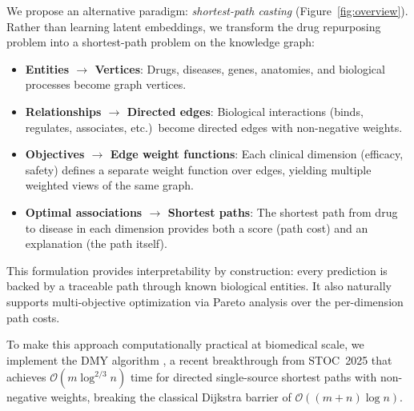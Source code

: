 \documentclass[11pt,a4paper]{article}
\newcommand{\BigO}[1]{\mathcal{O}(#1)}
\begin{document}
We propose an alternative paradigm: \emph{shortest-path casting}
(Figure~\ref{fig:overview}). Rather than learning latent embeddings,
we transform the drug repurposing problem into a shortest-path
problem on the knowledge graph:

\begin{itemize}
    \item \textbf{Entities $\to$ Vertices}: Drugs, diseases, genes,
    anatomies, and biological processes become graph vertices.
    \item \textbf{Relationships $\to$ Directed edges}: Biological
    interactions (binds, regulates, associates, etc.)\ become
    directed edges with non-negative weights.
    \item \textbf{Objectives $\to$ Edge weight functions}: Each
    clinical dimension (efficacy, safety) defines a separate weight
    function over edges, yielding multiple weighted views of the
    same graph.
    \item \textbf{Optimal associations $\to$ Shortest paths}: The
    shortest path from drug to disease in each dimension provides
    both a score (path cost) and an explanation (the path itself).
\end{itemize}

This formulation provides interpretability by construction: every
prediction is backed by a traceable path through known biological
entities. It also naturally supports multi-objective optimization
via Pareto analysis over the per-dimension path costs.

To make this approach computationally practical at biomedical scale,
we implement the DMY algorithm \citep{duan2025sssp}, a recent
breakthrough from STOC~2025 that achieves $\BigO{m \log^{2/3} n}$
time for directed single-source shortest paths with non-negative
weights, breaking the classical Dijkstra barrier of
$\BigO{(m+n) \log n}$.
\end{document}
